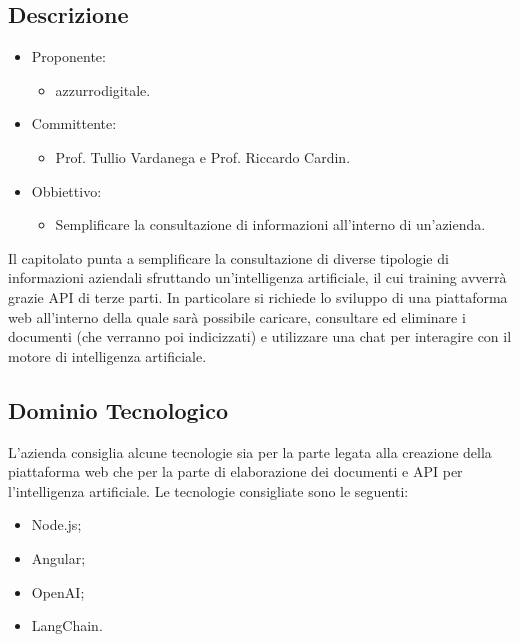 \documentclass[a4paper, twoside]{article}
\begin{document}
        \subsection{Descrizione}
            \begin{itemize}
                \item Proponente:
                \begin{itemize}
                    \item azzurrodigitale.
                \end{itemize}
                \item Committente:
                \begin{itemize}
                    \item Prof. Tullio Vardanega e Prof.
                    Riccardo Cardin.
                \end{itemize}
                \item Obbiettivo:
                \begin{itemize}
                    \item Semplificare la consultazione di informazioni all'interno di un'azienda.
                \end{itemize}
            \end{itemize}
            Il capitolato punta a semplificare la consultazione di
            diverse tipologie di informazioni aziendali sfruttando
            un'intelligenza artificiale, il cui training avverrà
            grazie API di terze parti. In particolare si richiede
            lo sviluppo di una piattaforma web all'interno della quale sarà possibile caricare, consultare ed eliminare i documenti (che verranno poi indicizzati) e utilizzare una chat per interagire con il motore di intelligenza artificiale.
        \subsection{Dominio Tecnologico}
            L'azienda consiglia alcune tecnologie sia per la parte legata alla creazione della piattaforma web che per la parte di elaborazione dei documenti e API per l'intelligenza artificiale. Le tecnologie consigliate sono le seguenti:
            \begin{itemize}
                \item Node.js;
                \item Angular;
                \item OpenAI;
                \item LangChain.
            \end{itemize}
\end{document}
